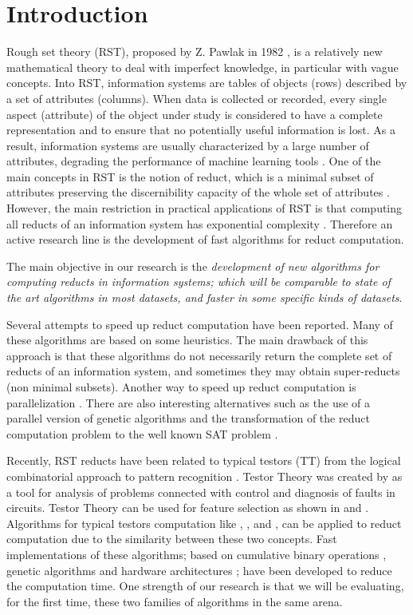 \documentclass[authoryear,11pt]{elsarticle}
\begin{document}
\section{Introduction}
  Rough set theory (RST), proposed by Z. Pawlak in 1982 \citep{Pawlak81,Pawlak81-2,Pawlak82,Pawlak91}, is a relatively new mathematical theory to deal with imperfect knowledge, in particular with vague concepts. Into RST, information systems are tables of objects (rows) described by a set of attributes (columns). When data is collected or recorded, every single aspect (attribute) of the object under study is considered to have a complete representation and to ensure that no potentially useful information is lost. As a result, information systems are usually characterized by a large number of attributes, degrading the performance of machine learning tools \citep{Parthalain08}. One of the main concepts in RST is the notion of reduct, which is a minimal subset of attributes preserving the discernibility capacity of the whole set of attributes \citep{Pawlak91}. However, the main restriction in practical applications of RST is that computing all reducts of an information system has exponential complexity \citep{Skowron92}. Therefore an active research line is the development of fast algorithms for reduct computation.
  
  The main objective in our research is the \emph{development of new algorithms for computing reducts in  	information systems; which will be comparable to state of the art algorithms in most datasets, and faster in some specific kinds of datasets}. 
  
  Several attempts to speed up reduct computation have been reported. Many of these algorithms are based on some heuristics. The main drawback of this approach is that these algorithms do not necessarily return the complete set of reducts of an information system, and sometimes they may obtain super-reducts (non minimal subsets). Another way to speed up reduct computation is parallelization \citep{Strakowski08}. There are also interesting alternatives such as the use of a parallel version of genetic algorithms \citep{Wroblewski98} and the transformation of the reduct computation problem to the well known SAT problem \citep{Jensen14}.  
  
  Recently, RST reducts have been related to typical testors (TT) from the logical combinatorial approach   to pattern recognition \citep{Lazo15}. Testor Theory was created by \cite{Cheguis55} as a tool for analysis of problems connected with control and diagnosis of faults in circuits. Testor Theory can be used for feature selection as shown in \citep{Ruiz08} and \citep{Martinez01}. Algorithms for typical testors computation like \citep{Ruiz85}, \citep{Santiesteban03}, \citep{Sanchez07} and \citep{Lias09}, can be applied to reduct computation due to the similarity between these two concepts. Fast implementations of these algorithms; based on cumulative binary operations \citep{Sanchez10}, genetic   algorithms \citep{Sanchez99} and hardware architectures \citep{Rojas12}; have been developed to reduce the computation time. One strength of our research is that we will be evaluating, for the first time, these two families of algorithms in the same arena.  
  
\end{document}

